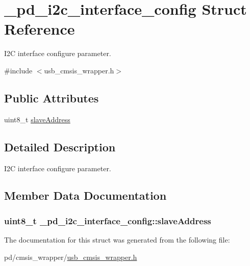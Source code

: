 \hypertarget{struct__pd__i2c__interface__config}{\section{\-\_\-pd\-\_\-i2c\-\_\-interface\-\_\-config Struct Reference}
\label{struct__pd__i2c__interface__config}
}


I2\-C interface configure parameter.  




{\ttfamily \#include $<$usb\-\_\-cmsis\-\_\-wrapper.\-h$>$}

\subsection*{Public Attributes}
\begin{DoxyCompactItemize}
\item 
uint8\-\_\-t \hyperlink{struct__pd__i2c__interface__config_abef5bc903024c7f0c489407549948987}{slave\-Address}
\end{DoxyCompactItemize}


\subsection{Detailed Description}
I2\-C interface configure parameter. 

\subsection{Member Data Documentation}
\hypertarget{struct__pd__i2c__interface__config_abef5bc903024c7f0c489407549948987}{
\subsubsection[{slave\-Address}]{\setlength{\rightskip}{0pt plus 5cm}uint8\-\_\-t \-\_\-pd\-\_\-i2c\-\_\-interface\-\_\-config\-::slave\-Address}}\label{struct__pd__i2c__interface__config_abef5bc903024c7f0c489407549948987}


The documentation for this struct was generated from the following file\-:\begin{DoxyCompactItemize}
\item 
pd/cmsis\-\_\-wrapper/\hyperlink{usb__cmsis__wrapper_8h}{usb\-\_\-cmsis\-\_\-wrapper.\-h}\end{DoxyCompactItemize}

